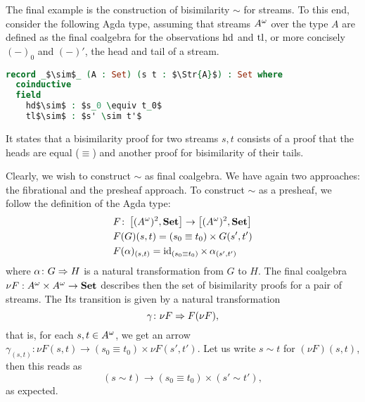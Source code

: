 \documentclass[runningheads,envcountsame,envcountsect,orivec]{llncs}
\begin{document}
\begin{example}[Bisimilarity]
  The final example is the construction of bisimilarity $\sim$ for streams.
  To this end, consider the following Agda type, assuming that streams
  ${A}^{\omega}$ over the type $A$ are defined as the final coalgebra for the
  observations $\operatorname{hd}$ and $\operatorname{tl}$, or more concisely $(-)_0$ and $(-)'$, the
  head and tail of a stream.
\begin{lstlisting}[language=Agda,mathescape=true,columns=flexible]
record _$\sim$_ (A : Set) (s t : $\Str{A}$) : Set where
  coinductive
  field
    hd$\sim$ : $s_0 \equiv t_0$
    tl$\sim$ : $s' \sim t'$
\end{lstlisting}
  It states that a bisimilarity proof for two streams $s,t$ consists of a proof
  that the heads are equal ($\equiv$) and another proof for bisimilarity of
  their tails.

  Clearly, we wish to construct $\sim$ as final coalgebra.
  We have again two approaches: the fibrational and the presheaf approach.
  To construct $\sim$ as a presheaf, we follow the definition of the Agda type:
  \begin{align*}
    & F \colon \left[ ({A}^{\omega})^2, \mathbf{Set} \right] \rightarrow \left[ ({A}^{\omega})^2, \mathbf{Set} \right] \\
    & F(G)(s,t) = (s_0 \equiv t_0) \times G(s',t') \\
    & F(\alpha)_{(s,t)} = \operatorname{id}_{(s_0 \equiv t_0)} \times \, \alpha_{(s',t')}
  \end{align*}
  where $\alpha \colon G \Rightarrow H$ is a natural transformation from $G$ to $H$.
  The final coalgebra $\nu F : {A}^{\omega} \times {A}^{\omega} \to \mathbf{Set}$ describes then
  the set of bisimilarity proofs for a pair of streams.
  The Its transition is given by a natural transformation
  \begin{equation*}
    \gamma \colon \nu F \Rightarrow F (\nu F),
  \end{equation*}
  that is, for each $s,t \in {A}^{\omega}$, we get an arrow
  $\gamma_{(s,t)} : \nu F(s,t) \to (s_0 \equiv t_0) \times \nu F (s',t')$.
  Let us write $s \sim t$ for $(\nu F)(s,t)$, then this reads as
  \begin{equation*}
    (s \sim t) \to (s_0 \equiv t_0) \times (s' \sim t'),
  \end{equation*}
  as expected.


\end{example}
\end{document}
